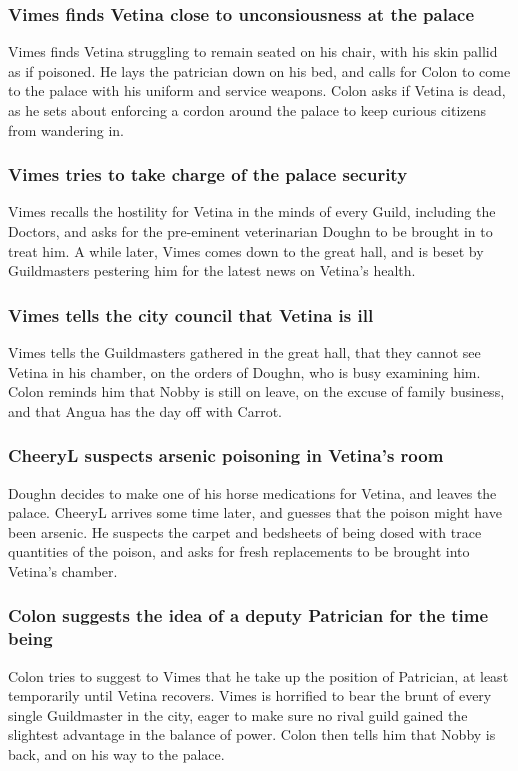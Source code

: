 \subsubsection{\Gls{Vimes} finds \Gls{Vetina} close to unconsiousness at the palace}
\Gls{Vimes} finds \Gls{Vetina} struggling to remain seated on his chair, with his skin pallid as if
poisoned. He lays the patrician down on his bed, and calls for \Gls{Colon} to come to the palace
with his uniform and service weapons. \Gls{Colon} asks if \Gls{Vetina} is dead, as he sets about
enforcing a cordon around the palace to keep curious citizens from wandering in.

\subsubsection{\Gls{Vimes} tries to take charge of the palace security}
\Gls{Vimes} recalls the hostility for \Gls{Vetina} in the minds of every Guild, including the
Doctors, and asks for the pre-eminent veterinarian \Gls{Doughn} to be brought in to treat him. A
while later, \Gls{Vimes} comes down to the great hall, and is beset by Guildmasters pestering him
for the latest news on \Gls{Vetina}'s health.

\subsubsection{\Gls{Vimes} tells the city council that \Gls{Vetina} is ill}
\Gls{Vimes} tells the Guildmasters gathered in the great hall, that they cannot see \Gls{Vetina}
in his chamber, on the orders of \Gls{Doughn}, who is busy examining him. \Gls{Colon} reminds him
that \Gls{Nobby} is still on leave, on the excuse of family business, and that \Gls{Angua} has the
day off with \Gls{Carrot}.

\subsubsection{\Gls{CheeryL} suspects arsenic poisoning in \Gls{Vetina}'s room}
\Gls{Doughn} decides to make one of his horse medications for \Gls{Vetina}, and leaves the palace.
\Gls{CheeryL} arrives some time later, and guesses that the poison might have been arsenic. He
suspects the carpet and bedsheets of being dosed with trace quantities of the poison, and asks for
fresh replacements to be brought into \Gls{Vetina}'s chamber.

\subsubsection{\Gls{Colon} suggests the idea of a deputy Patrician for the time being}
\Gls{Colon} tries to suggest to \Gls{Vimes} that he take up the position of Patrician, at least
temporarily until \Gls{Vetina} recovers. \Gls{Vimes} is horrified to bear the brunt of every single
Guildmaster in the city, eager to make sure no rival guild gained the slightest advantage in the
balance of power. \Gls{Colon} then tells him that \Gls{Nobby} is back, and on his way to the palace.

